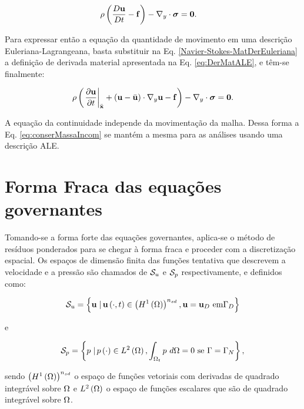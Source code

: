 \documentclass[tese_patricia]{subfiles}%
\begin{document}
\begin{align}
	\rho\left(\frac{D\mathbf{u}}{Dt} - \mathbf{f} \right) - \nabla_y \cdot \boldsymbol{\sigma} &= \mathbf{0}. \label{Navier-Stokes-MatDerEuleriana}
\end{align}

Para expressar então a equação da quantidade de movimento em uma descrição Euleriana-Lagrangeana, basta substituir na Eq. \ref{Navier-Stokes-MatDerEuleriana} a definição de derivada material apresentada na Eq. \ref{eq:DerMatALE}, e têm-se finalmente:

\begin{align}
	\rho\left(\left. \frac{\partial\mathbf{u}}{\partial t} \right|_{\bar{\mathbf{x}}} + \left(\mathbf{u} - \bar{\mathbf{u}} \right) \cdot \nabla_y  \mathbf{u}  - \mathbf{f} \right) - \nabla_y \cdot \boldsymbol{\sigma} = \mathbf{0}. \label{eq:Navier-StokesALE} 
\end{align}

A equação da continuidade independe da movimentação da malha. Dessa forma a Eq. \ref{eq:conserMassaIncom} se mantém a mesma para as análises usando uma descrição ALE.


\section{Forma Fraca das equações governantes} \label{capitulo:Cap2:FormaFraca}

Tomando-se a forma forte das equações governantes, aplica-se o método de resíduos ponderados para se chegar à forma fraca e proceder com a discretização espacial. Os espaços de dimensão finita das funções tentativa que descrevem a velocidade e a pressão são chamados de $\mathcal{S}_u$ e $\mathcal{S}_p$ respectivamente, e definidos como:

\begin{align}
\mathcal{S}_u = \left\{\mathbf{u} \left . \right| \mathbf{u} \left(\cdot,t\right) \in \left(H^{1}\left(\Omega\right)\right)^{n_{sd}}, \mathbf{u} = \mathbf{u}_D \textrm { em} \Gamma_{D} \right\}
\end{align}

\noindent e

\begin{align}
\mathcal{S}_p = \left\{p \left . \right| p \left(\cdot\right) \in L^{2}\left(\Omega\right), \int_{\Omega_t}p \textrm { } d\Omega = 0 \textrm { se } \Gamma = \Gamma_{N} \right\},
\end{align}

\noindent sendo $\left(H^{1}\left(\Omega\right)\right)^{n_{sd}}$ o espaço de funções vetoriais com derivadas de quadrado integrável sobre $\Omega$ e $L^{2}\left(\Omega\right)$ o espaço de funções escalares que são de quadrado integrável sobre $\Omega$.
\end{document}
